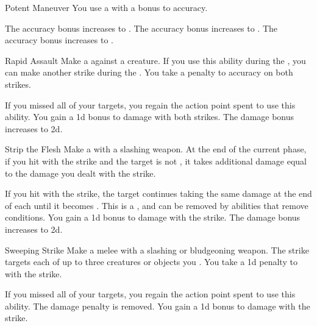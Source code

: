 {            \begin{ability}{Potent Maneuver}
                You use a  with a  bonus to accuracy.

                \rankline
                 The accuracy bonus increases to .
                 The accuracy bonus increases to .
                 The accuracy bonus increases to .
            \end{ability}

            \begin{ability}{Rapid Assault}
                Make a  against a creature.
                If you use this ability during the , you can make another strike during the .
                You take a  penalty to accuracy on both strikes.

                \rankline
                 If you missed all of your targets, you regain the action point spent to use this ability.
                 You gain a \plus1d bonus to damage with both strikes.
                 The damage bonus increases to \plus2d.
            \end{ability}

            \begin{ability}{Strip the Flesh}
                Make a  with a slashing weapon.
                At the end of the current phase, if you hit with the strike and the target is not , it takes additional damage equal to the damage you dealt with the strike.

                \rankline
                 If you hit with the strike, the target continues taking the same damage at the end of each  until it becomes .
                This is a , and can be removed by abilities that remove conditions.
                 You gain a \plus1d bonus to damage with the strike.
                 The damage bonus increases to \plus2d.
            \end{ability}

            \begin{ability}{Sweeping Strike}
                Make a melee  with a slashing or bludgeoning weapon.
                The strike targets each of up to three creatures or objects you .
                You take a \minus1d penalty to  with the strike.

                \rankline
                 If you missed all of your targets, you regain the action point spent to use this ability.
                 The damage penalty is removed.
                 You gain a \plus1d bonus to damage with the strike.
            \end{ability}
        }

